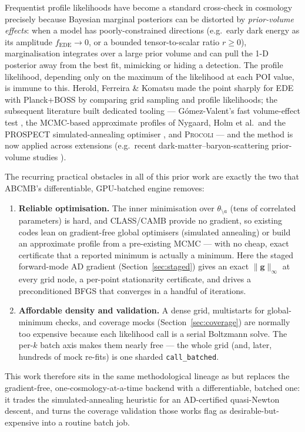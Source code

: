 \documentclass[11pt]{article}
\newcommand{\code}[1]{\texttt{\small #1}}
\newcommand{\ginf}{\lVert \bm{g}\rVert_\infty}
\begin{document}
Frequentist profile likelihoods have become a standard cross-check in
cosmology precisely because Bayesian marginal posteriors can be distorted
by \emph{prior-volume effects}: when a model has poorly-constrained
directions (e.g.\ early dark energy as its amplitude
$f_{\mathrm{EDE}}\to0$, or a bounded tensor-to-scalar ratio $r\ge0$),
marginalisation integrates over a large prior volume and can pull the 1-D
posterior away from the best fit, mimicking or hiding a detection. The
profile likelihood, depending only on the maximum of the likelihood at
each POI value, is immune to this. Herold, Ferreira \& Komatsu
\cite{Herold2022} made the point sharply for EDE with Planck+BOSS by
comparing grid sampling and profile likelihoods; the subsequent literature
built dedicated tooling --- Gómez-Valent's fast volume-effect test
\cite{GomezValent2022}, the MCMC-based approximate profiles of Nygaard,
Holm et al.\ and the \textsc{PROSPECT} simulated-annealing optimiser
\cite{Nygaard2023,Holm2024}, and \textsc{Procoli} \cite{Karwal2024} ---
and the method is now applied across extensions (e.g.\ recent
dark-matter--baryon-scattering prior-volume studies \cite{DMb2026}).

The recurring practical obstacles in all of this prior work are exactly the
two that \textsc{ABCMB}'s differentiable, GPU-batched engine removes:
\begin{enumerate}[leftmargin=2em,itemsep=1pt]
\item \textbf{Reliable optimisation.} The inner minimisation over
$\theta_{\setminus a}$ (tens of correlated parameters) is hard, and
CLASS/CAMB provide no gradient, so existing codes lean on gradient-free
global optimisers (simulated annealing) or build an approximate profile
from a pre-existing MCMC --- with no cheap, exact certificate that a
reported minimum is actually a minimum. Here the staged forward-mode AD
gradient (Section~\ref{sec:staged}) gives an exact $\ginf$ at every grid
node, a per-point stationarity certificate, and drives a preconditioned
BFGS that converges in a handful of iterations.
\item \textbf{Affordable density and validation.} A dense grid, multistarts
for global-minimum checks, and coverage mocks (Section~\ref{sec:coverage})
are normally too expensive because each likelihood call is a serial
Boltzmann solve. The per-$k$ batch axis makes them nearly free --- the
whole grid (and, later, hundreds of mock re-fits) is one sharded
\code{call\_batched}.
\end{enumerate}
This work therefore sits in the same methodological lineage as
\cite{Herold2022,Nygaard2023,Holm2024,Karwal2024} but replaces the
gradient-free, one-cosmology-at-a-time backend with a differentiable,
batched one: it trades the simulated-annealing heuristic for an
AD-certified quasi-Newton descent, and turns the coverage validation those
works flag as desirable-but-expensive into a routine batch job.
\end{document}
